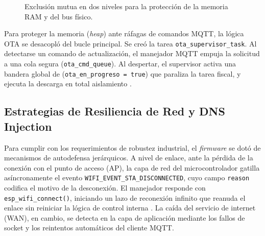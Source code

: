\begin{figure}[htb]
\centering
{}
\caption{Exclusión mutua en dos niveles para la protección de la memoria RAM y del bus físico.}
\label{fig:mutex_doble}
\end{figure}

\par Para proteger la memoria (\textit{heap}) ante ráfagas de comandos MQTT, la lógica OTA se desacopló del bucle principal. Se creó la tarea \texttt{ota\_supervisor\_task}. Al detectarse un comando de actualización, el manejador MQTT empuja la solicitud a una cola segura (\texttt{ota\_cmd\_queue}). Al despertar, el supervisor activa una bandera global de  (\texttt{ota\_en\_progreso = true}) que paraliza la tarea fiscal, y ejecuta la descarga en total aislamiento \cite{Espressif_ESP_IDF_v552}.

\subsection{Estrategias de Resiliencia de Red y DNS Injection}

\par Para cumplir con los requerimientos de robustez industrial, el \textit{firmware} se dotó de mecanismos de autodefensa jerárquicos. A nivel de enlace, ante la pérdida de la conexión con el punto de acceso (AP), la capa de red del microcontrolador gatilla asíncronamente el evento \texttt{WIFI\_EVENT\_STA\_DISCONNECTED}, cuyo campo \texttt{reason} codifica el motivo de la desconexión. El manejador responde con \texttt{esp\_wifi\_connect()}, iniciando un lazo de reconexión infinito que reanuda el enlace sin reiniciar la lógica de control interna \cite{Espressif_ESP_IDF_v552}. La caída del servicio de internet (WAN), en cambio, se detecta en la capa de aplicación mediante los fallos de socket y los reintentos automáticos del cliente MQTT.\\

